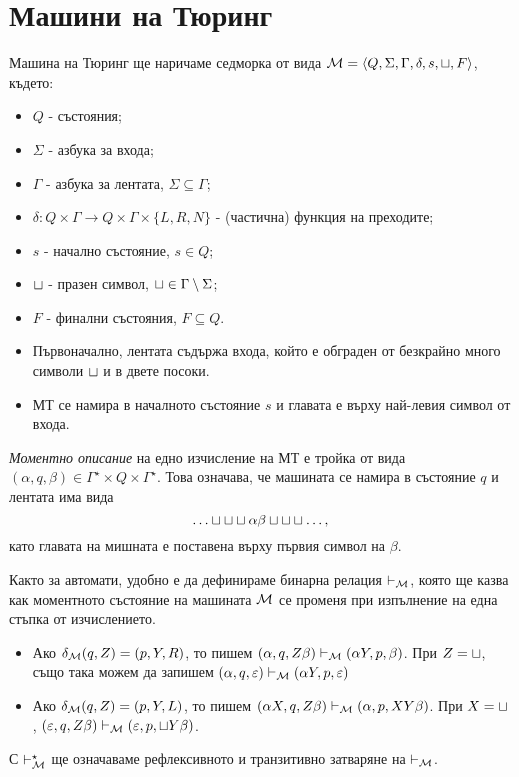 \chapter{Машини на Тюринг}

\newcommand{\tape}[1]{\dots\blank\blank\blank{#1}\blank\blank\blank\dots}

Машина на Тюринг ще наричаме седморка от вида $\mathcal{M} = \langle{Q,\Sigma,\Gamma,\delta,s,\sqcup,F}\rangle$, където:
\begin{itemize}
\item 
  $Q$ - състояния;
\item
  $\Sigma$ - азбука за входа;
\item
  $\Gamma$ - азбука за лентата, $\Sigma \subseteq \Gamma$;
\item
  $\delta:Q\times\Gamma \to Q\times \Gamma \times \{L,R,N\}$ - (частична) функция на преходите;
\item
  $s$ - начално състояние, $s \in Q$;
\item
  $\sqcup$ - празен символ,  $\sqcup \in \Gamma \setminus \Sigma$;
\item
  $F$ - финални състояния, $F \subseteq Q$.
\item 
  Първоначално, лентата съдържа входа, който е обграден от безкрайно много символи $\sqcup$ и в двете посоки.
\item
  МТ се намира в началното състояние $s$ и главата е върху най-левия символ от входа.
\end{itemize}

{\em Моментно описание} на едно изчисление на МТ е тройка от вида $(\alpha, q, \beta) \in \Gamma^\star\times Q \times \Gamma^\star$. Това означава, че
машината се намира в състояние $q$ и лентата има вида
\[\tape{\alpha\beta},\]
като главата на мишната е поставена върху първия символ на $\beta$.

Както за автомати, удобно е да дефинираме бинарна релация $\vdash_{\mathcal{M}}$,
която ще казва как моментното състояние на машината $\mathcal{M}$ се променя при 
изпълнение на една стъпка от изчислението.
\begin{itemize}
\item
  Ако $\delta_{\mathcal{M}}(q,Z) = (p,Y,R)$, то пишем
  $(\alpha, q, Z\beta) \vdash_{\mathcal{M}} (\alpha Y, p, \beta)$.
  При $Z = \sqcup$, също така можем да запишем 
  $(\alpha, q, \varepsilon) \vdash_{\mathcal{M}} (\alpha Y, p, \varepsilon)$
\item 
  Ако $\delta_{\mathcal{M}}(q,Z) = (p,Y,L)$, то пишем
  $(\alpha X, q, Z\beta) \vdash_{\mathcal{M}} (\alpha , p, XY\beta)$.
  При $X = \sqcup$, $(\varepsilon, q, Z\beta) \vdash_{\mathcal{M}} (\varepsilon, p, \sqcup Y\beta)$.
\end{itemize}
С $\vdash^\star_{\mathcal{M}}$ ще означаваме рефлексивното и транзитивно затваряне на $\vdash_{\mathcal{M}}$.

